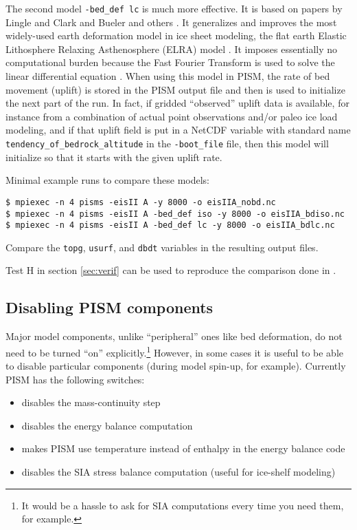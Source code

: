 The second model \verb|-bed_def lc| is much more effective.  It is based on papers by Lingle and Clark \cite{LingleClark}  and Bueler and others \cite{BLKfastearth}.  It generalizes and improves the most widely-used earth deformation model in ice sheet modeling, the flat earth Elastic Lithosphere Relaxing Asthenosphere (ELRA) model \cite{Greve2001}.  It imposes  essentially no computational burden because the Fast Fourier Transform is used to solve the linear differential equation \cite{BLKfastearth}.  When using this model in PISM, the rate of bed movement (uplift) is stored in the PISM output file and then is used to initialize the next part of the run.  In fact, if gridded ``observed'' uplift data is available, for instance from a combination of actual point observations and/or paleo ice load modeling, and if that uplift field is put in a NetCDF variable with standard name \verb|tendency_of_bedrock_altitude| in the  \texttt{-boot_file} file, then this model will initialize so that it starts with the given uplift rate.

Minimal example runs to compare these models:
\begin{verbatim}
$ mpiexec -n 4 pisms -eisII A -y 8000 -o eisIIA_nobd.nc
$ mpiexec -n 4 pisms -eisII A -bed_def iso -y 8000 -o eisIIA_bdiso.nc
$ mpiexec -n 4 pisms -eisII A -bed_def lc -y 8000 -o eisIIA_bdlc.nc
\end{verbatim}
Compare the \texttt{topg}, \texttt{usurf}, and \texttt{dbdt} variables in the resulting output files.

Test H in section \ref{sec:verif} can be used to reproduce the comparison done in \cite{BLKfastearth}.

\subsection{Disabling PISM components}
\label{sec:turning-off}

Major model components, unlike ``peripheral'' ones like bed deformation, do not need to be turned ``on'' explicitly.\footnote{It would be a hassle to ask for SIA computations every time you need them, for example.} However, in some cases it is useful to be able to disable particular components (during model spin-up, for example). Currently PISM has the following switches:
\begin{itemize}
\item {} disables the mass-continuity step
\item {} disables the energy balance computation
\item {} makes PISM use temperature instead of enthalpy in the energy balance code
\item {} disables the SIA stress balance computation (useful for ice-shelf modeling)
\end{itemize}



